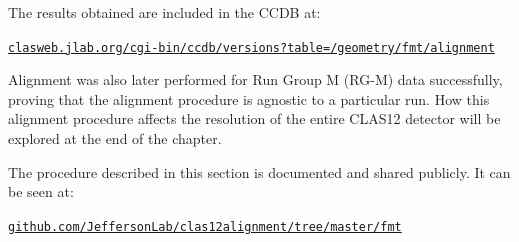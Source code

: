     The results obtained are included in the CCDB at:
    
    \small\href{https://clasweb.jlab.org/cgi-bin/ccdb/versions?table=/geometry/fmt/alignment}{\texttt{clasweb.jlab.org/cgi-bin/ccdb/versions?table=/geometry/fmt/alignment}}
    
    Alignment was also later performed for Run Group M (RG-M) data successfully, proving that the alignment procedure is agnostic to a particular run.
    How this alignment procedure affects the resolution of the entire CLAS12 detector will be explored at the end of the chapter.

    The procedure described in this section is documented and shared publicly.
    It can be seen at:
    
    \href{https://github.com/JeffersonLab/clas12alignment/tree/master/fmt}{\texttt{github.com/JeffersonLab/clas12alignment/tree/master/fmt}}
